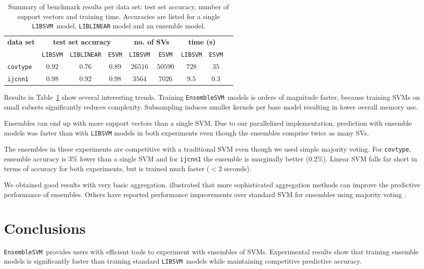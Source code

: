 \documentclass[twoside,11pt]{article}
\newcommand{\esvm}{\texttt{\selectfont EnsembleSVM}}
\newcommand{\esvmshort}{\texttt{ESVM}}
\newcommand{\libsvm}{\texttt{LIBSVM}}
\begin{document}
\addtolength{\partopsep}{-5mm}
\begin{table}[!h]
\centering
\begin{tabular}{lcccccccc}
\toprule 
{\bfseries data set} & \multicolumn{3}{c}{\bfseries test set accuracy} & 
\multicolumn{2}{c}{\bfseries no. of SVs} & \multicolumn{2}{c}{\bfseries time
(s)}
\\
 & \libsvm & \texttt{LIBLINEAR} & \esvmshort & \libsvm & \esvmshort & \libsvm
 & \esvmshort \\
\midrule 
{\tt covtype} & $0.92$ & $0.76$ & $0.89$ & $26516$ & $50590$ & $728$ & $35$ \\
{\tt ijcnn1} & $0.98$ & $0.92$ & $0.98$ & $3564$ & $7026$ & $9.5$ & $0.3$ \\
\bottomrule
\end{tabular}
\caption{Summary of benchmark results per data set: test set accuracy, number of
support vectors and training time. Accuracies are listed for a single \libsvm\ model, \texttt{LIBLINEAR} model and an ensemble model.}
\label{resultstable}
\end{table}
\addtolength{\partopsep}{5mm}

{\noindent}Results in Table~\ref{resultstable} show several interesting trends. Training \esvm\ models is orders of magnitude faster,
because training SVMs on small subsets significantly reduces complexity. Subsampling induces smaller kernels per base model resulting in lower overall memory use.

Ensembles can end up with more support vectors than a single SVM. Due to our parallelized implementation, prediction with ensemble models was faster than with \texttt{LIBSVM} models in both experiments even though the ensembles comprise twice as many SVs.

The ensembles in these experiments are competitive with a traditional SVM even though we used simple majority voting. For \texttt{covtype}, ensemble accuracy is $3\%$ lower than a single SVM and for \texttt{ijcnn1} the ensemble is marginally better ($0.2\%$). Linear SVM falls far short in terms of accuracy for both experiments, but is trained much faster ($< 2$ seconds).

We obtained good results with very basic aggregation. \citet{Collobert02} illustrated that more sophisticated aggregation methods can improve the predictive performance of ensembles. Others have reported performance improvements over standard SVM for
ensembles using majority voting \citep{Valentini03lowbias,Wang20096466}.
 
\section{Conclusions}
\esvm\ provides users with efficient tools to experiment with ensembles of
SVMs. Experimental results show that training ensemble models is significantly
faster than training standard \libsvm\ models while maintaining competitive predictive accuracy.
\end{document}
